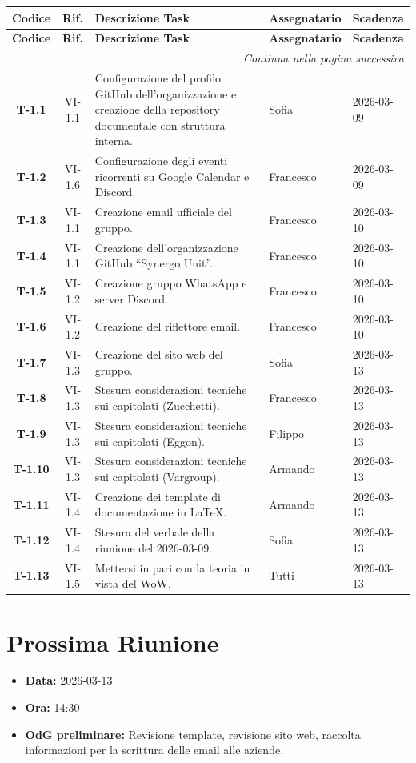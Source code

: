 \begin{longtable}{c c p{7.5cm} l l}
    \toprule
    \textbf{Codice} & \textbf{Rif.} & \textbf{Descrizione Task} & \textbf{Assegnatario} & \textbf{Scadenza} \\
    \midrule
    \endfirsthead

    \toprule
    \textbf{Codice} & \textbf{Rif.} & \textbf{Descrizione Task} & \textbf{Assegnatario} & \textbf{Scadenza} \\
    \midrule
    \endhead

    \midrule
    \multicolumn{5}{r}{\textit{Continua nella pagina successiva}} \\
    \midrule
    \endfoot

    \bottomrule
    \endlastfoot

    \textbf{T-1.1} & VI-1.1 & Configurazione del profilo GitHub dell’organizzazione e creazione della repository documentale con struttura interna. & Sofia & 2026-03-09 \\
    \textbf{T-1.2} & VI-1.6 & Configurazione degli eventi ricorrenti su Google Calendar e Discord. & Francesco & 2026-03-09 \\

    \textbf{T-1.3} & VI-1.1 & Creazione email ufficiale del gruppo. & Francesco & 2026-03-10 \\
    \textbf{T-1.4} & VI-1.1 & Creazione dell’organizzazione GitHub “Synergo Unit”. & Francesco & 2026-03-10 \\
    \textbf{T-1.5} & VI-1.2 & Creazione gruppo WhatsApp e server Discord. & Francesco & 2026-03-10 \\
    \textbf{T-1.6} & VI-1.2 & Creazione del riflettore email. & Francesco & 2026-03-10 \\

    \textbf{T-1.7} & VI-1.3 & Creazione del sito web del gruppo. & Sofia & 2026-03-13 \\
    \textbf{T-1.8} & VI-1.3 & Stesura considerazioni tecniche sui capitolati (Zucchetti). & Francesco & 2026-03-13 \\
    \textbf{T-1.9} & VI-1.3 & Stesura considerazioni tecniche sui capitolati (Eggon). & Filippo & 2026-03-13 \\
    \textbf{T-1.10} & VI-1.3 & Stesura considerazioni tecniche sui capitolati (Vargroup). & Armando & 2026-03-13 \\
    \textbf{T-1.11} & VI-1.4 & Creazione dei template di documentazione in LaTeX. & Armando & 2026-03-13 \\
    \textbf{T-1.12} & VI-1.4 & Stesura del verbale della riunione del 2026-03-09. & Sofia & 2026-03-13 \\
    \textbf{T-1.13} & VI-1.5 & Mettersi in pari con la teoria in vista del WoW. & Tutti & 2026-03-13 \\
\end{longtable}

\section{Prossima Riunione}
\begin{itemize}
    \item \textbf{Data:} 2026-03-13
    \item \textbf{Ora:} 14:30
    \item \textbf{OdG preliminare:} Revisione template, revisione sito web, raccolta informazioni per la scrittura delle email alle aziende.
\end{itemize}
